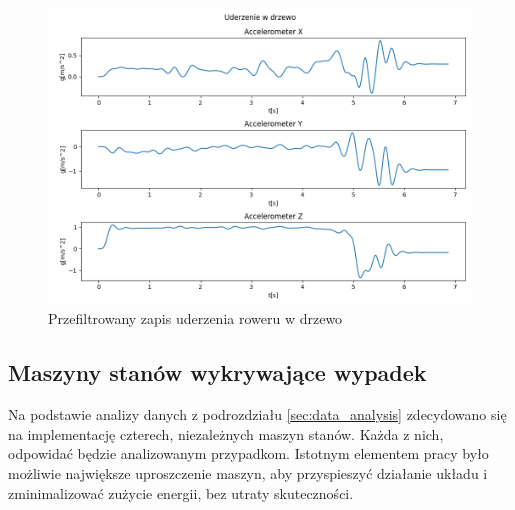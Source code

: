 \begin{figure}[h]
    \centering
    \includegraphics[width=15cm]{Graphics/Tree_title.png}
    \caption{Przefiltrowany zapis uderzenia roweru w drzewo}
    \label{img:tree}
\end{figure}

\subsection{Maszyny stanów wykrywające wypadek}
\label{sec:state_machines}
Na podstawie analizy danych z podrozdziału \ref{sec:data_analysis} zdecydowano się na implementację czterech, niezależnych maszyn stanów. Każda z nich, odpowidać będzie analizowanym przypadkom. Istotnym elementem pracy było możliwie największe uproszczenie maszyn, aby przyspieszyć działanie układu i zminimalizować zużycie energii, bez utraty skuteczności.
